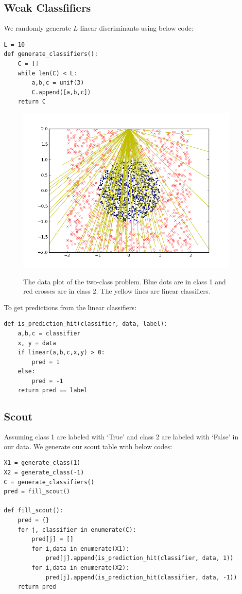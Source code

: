 \documentclass[]{article}  %
\begin{document}
\subsection{Weak Classfifiers}
We randomly generate $L$ linear discriminants using below code:
\begin{verbatim}
L = 10
def generate_classifiers():
    C = []
    while len(C) < L:
        a,b,c = unif(3)
        C.append([a,b,c])
    return C
\end{verbatim}

\begin{figure}[h]
\begin{center}
\includegraphics[scale=.6]{plain_with_c.png}\label{fig:axis}
\end{center}
\caption{The data plot of the two-class problem. Blue dots are in class 1 and red crosses are in class 2. The yellow lines are linear classifiers.}
\end{figure}%

To get predictions from the linear classifiers:

\begin{verbatim}
def is_prediction_hit(classifier, data, label):
    a,b,c = classifier
    x, y = data
    if linear(a,b,c,x,y) > 0:
        pred = 1
    else:
        pred = -1
    return pred == label
\end{verbatim}

\subsection{Scout}
Assuming class 1 are labeled with `True' and class 2 are labeled with `False' in our data. We generate our scout table with below codes:
\begin{verbatim}
X1 = generate_class(1)
X2 = generate_class(-1)
C = generate_classifiers()
pred = fill_scout()

def fill_scout():
    pred = {}
    for j, classifier in enumerate(C):
        pred[j] = []
        for i,data in enumerate(X1):
            pred[j].append(is_prediction_hit(classifier, data, 1))
        for i,data in enumerate(X2):
            pred[j].append(is_prediction_hit(classifier, data, -1))
    return pred
\end{verbatim}
\end{document}
